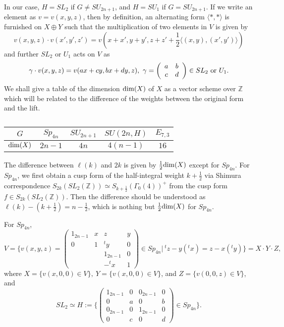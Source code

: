 \documentclass[11pt]{amsart}
\numberwithin{equation}{section}
\theoremstyle{definition}
\begin{document}
In our case, $H=SL_2$ if $G\not= SU_{2n+1}$, and $H=SU_1$ if $G=SU_{2n+1}$.
If we write an element as $v=v(x,y,z)$, then by definition, an alternating form $\langle \ast,\ast \rangle$ is
furnished on
$X\oplus Y$ such that the multiplication of two elements in $V$ is given by
$$v(x,y,z)\cdot v(x',y',z')=v(x+x',y+y',z+z'+\frac{1}{2}\langle (x,y),(x',y') \rangle)
$$
and further $SL_2$ or $U_1$ acts on $V$ as
$$\gamma\cdot v(x,y,z)=v(ax+cy,bx+dy,z),\ \gamma=\left(
\begin{array}{cc}
a & b \\
c & d
\end{array}\right)\in SL_2\ {\rm or}\ U_1.$$
We shall give a table of the dimension ${\rm dim}(X)$ of $X$ as a vector scheme over ${\mathbb{Z}}$ which will be related to the difference of the weights between the original form and the lift.
\begin{table}[htbp]
\begin{center}
{
\begin{tabular}{|c|c|c|c|c|}
\hline
$G$  &  $Sp_{4n}$  & $SU_{2n+1}$ & $SU(2n,H)$ & $E_{7,3}$    \\
\hline
${\rm dim}(X)$  & $2n-1$  &  $4n$ & $4(n-1)$  & $16$    \\
\hline
\end{tabular}}
\end{center}
\caption{}
\end{table}

The difference between $\ell(k)$ and $2k$ is given by $\frac{1}{2}{\rm dim}(X)$ except for $Sp_{4n}$.
For $Sp_{4n}$, we first obtain a cusp form of the half-integral weight $k+\frac 12$  via Shimura correspondence
$S_{2k}(SL_2({\mathbb{Z}}))\simeq S_{k+\frac{1}{2}}(\Gamma_0(4))^+$  from the cusp form $f\in S_{2k}(SL_2({\mathbb{Z}}))$. Then the difference should be
understood as
$\ell(k)-(k+\frac{1}{2})=n-\frac{1}{2}$, which is nothing but $\frac{1}{2}{\rm dim}(X)$ for $Sp_{4n}$.

For $Sp_{4n}$,
$$V=\Bigg\{v(x,y,z)=\left(
\begin{array}{cccc}
1_{2n-1} & x & z & y \\
0 & 1 & {}^t y & 0 \\
  &   &     1_{2n-1}  & 0 \\
  &   &     -{}^t x & 1
 \end{array}\right)\in Sp_{4n} \Bigg|\ {}^tz-y({}^t x)=z-x({}^t y)    \Bigg\}=X\cdot Y\cdot Z,
$$
where
$X=\{v(x,0,0)\in V\},\ Y=\{v(x,0,0)\in V\}$, and $Z=\{v(0,0,z)\in V\}$, and
\begin{equation}\label{SL}
SL_2\simeq H:=\Bigg\{\left(
\begin{array}{cccc}
1_{2n-1} & 0 & 0_{2n-1} & 0 \\
0 & a &  0 & b \\
0_{2n-1}  & 0  &     1_{2n-1}  & 0 \\
 0 & c  &     0 & d
 \end{array}\right)\in  Sp_{4n} \Bigg\}.
\end{equation}
\end{document}
